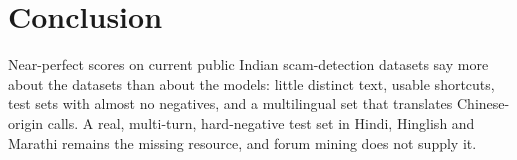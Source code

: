 \documentclass[conference]{IEEEtran}
\begin{document}
\section{Conclusion}
Near-perfect scores on current public Indian scam-detection datasets say more about the datasets than about the models: little distinct text, usable shortcuts, test sets with almost no negatives, and a multilingual set that translates Chinese-origin calls. A real, multi-turn, hard-negative test set in Hindi, Hinglish and Marathi remains the missing resource, and forum mining does not supply it.



\end{document}
